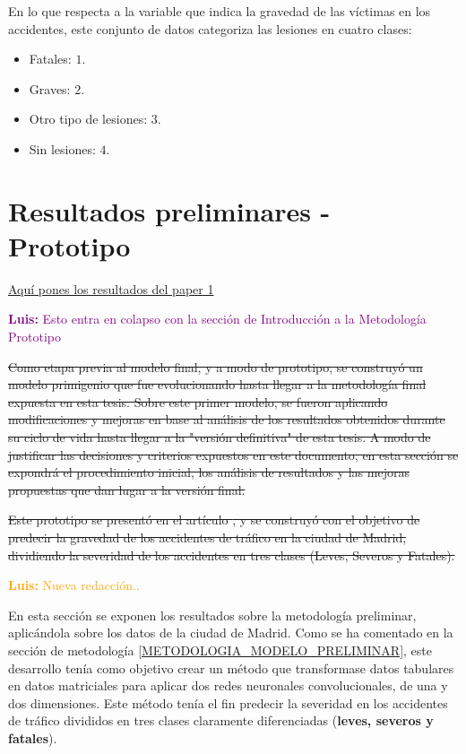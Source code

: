 \documentclass{uathesis-es}
\begin{document}
{	En lo que respecta a la variable que indica la gravedad de las víctimas en los accidentes, este conjunto de datos categoriza las lesiones en cuatro clases:
	
	\begin{itemize}
		\item Fatales: $1$.
		\item Graves: $2$.
		\item Otro tipo de lesiones: $3$.
		\item Sin lesiones: $4$.
	\end{itemize}
	
	\section{Resultados preliminares - Prototipo}
	
	\underline{Aquí pones los resultados del paper 1}
	
	\textcolor{purple}{\textbf{Luis: }Esto entra en colapso con la sección de Introducción a la Metodología Prototipo}
	
	\sout{Como etapa previa al modelo final, y a modo de prototipo, se construyó un modelo primigenio que fue evolucionando hasta llegar a la metodología final expuesta en esta tesis. Sobre este primer modelo, se fueron aplicando modificaciones y mejoras en base al análisis de los resultados obtenidos durante su ciclo de vida hasta llegar a la "versión definitiva" de esta tesis. A modo de justificar las decisiones y criterios expuestos en este documento, en esta sección se expondrá el procedimiento inicial, los análisis de resultados y las mejoras propuestas que dan lugar a la versión final.}
	
	
	\sout{Este prototipo se presentó en el artículo \cite{PEREZSALA2023113245}, y se construyó con el objetivo de predecir la gravedad de los accidentes de tráfico en la ciudad de Madrid, dividiendo la severidad de los accidentes en tres clases (Leves, Severos y Fatales). }
	
	\textcolor{orange}{\textbf{Luis: } Nueva redacción..}
	
	En esta sección se exponen los resultados sobre la metodología preliminar, aplicándola sobre los datos de la ciudad de Madrid. Como se ha comentado en la sección de metodología \ref{METODOLOGIA_MODELO_PRELIMINAR}, este desarrollo tenía como objetivo crear un método que transformase datos tabulares en datos matriciales para aplicar dos redes neuronales convolucionales, de una y dos dimensiones. Este método tenía el fin predecir la severidad en los accidentes de tráfico divididos en tres clases claramente diferenciadas (\textbf{leves, severos y fatales}). 
	
}
\end{document}
